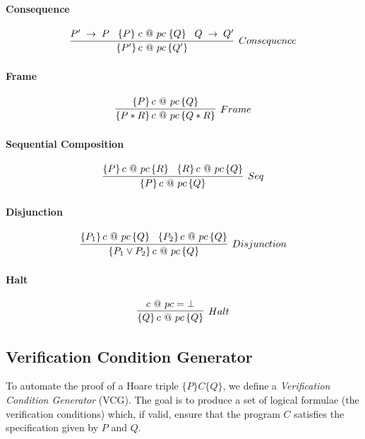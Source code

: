 \documentclass[sigconf]{acmart}
\begin{document}
\paragraph{Consequence}
\[
    \infer[Consequence]
        { \{ P' \} \, c \text{ @ } pc \, \{ Q'\} }
        {P' \; \to \; P \hspace{0.3cm}
        \{ P\} \; c \text{ @ } pc \; \{ Q \} \hspace{0.3cm} 
        Q \; \to \; Q' }
\]

\paragraph{Frame}
\[
    \infer[Frame]
        { \{ P * R \} \, c \text{ @ } pc \, \{ Q * R\} }
        { \{ P \} \, c \text{ @ } pc \, \{ Q\} }
\]
\paragraph{Sequential Composition}
\[
    \infer[Seq]
        { \{ P \} \, c \text{ @ } pc \, \{ Q\} }
        { \{ P \} \, c \text{ @ } pc \, \{ R\}
          \hspace{0.3cm}
          \{ R \} \, c \text{ @ } pc \, \{ Q\} }
\]

\paragraph{Disjunction}
\[
    \infer[Disjunction]
        { \{ P_1 \lor P_2\} \, c \text{ @ } pc \, \{ Q\} }
        { \{ P_1 \} \, c \text{ @ } pc \, \{ Q\}
          \hspace{0.3cm}
          \{ P_2 \} \, c \text{ @ } pc \, \{ Q\} }
\]
\paragraph{Halt}
\[
    \infer[Halt]
        { \{ Q \} \, c \text{ @ } pc \, \{ Q\} }
        { c \text{ @ } pc = \bot }
\]

\subsection{Verification Condition Generator}

To automate the proof of a Hoare triple $\{P\} C \{Q\}$, we define a \textit{Verification Condition Generator} (VCG). The goal is to produce a set of logical formulae (the verification conditions) which, if valid, ensure that the program $C$ satisfies the specification given by $P$ and $Q$.
\end{document}
